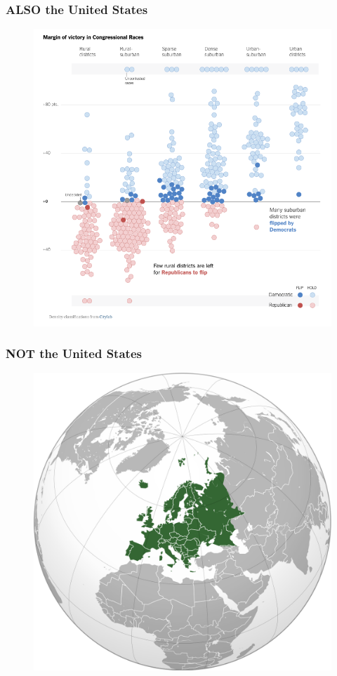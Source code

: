 \documentclass[20pt]{beamer}
\begin{document}
\begin{frame}
\frametitle{ALSO the United States}
\begin{figure}[H]    \centering
	{	 \includegraphics[width=.7\textwidth]{ClayLab}}
\end{figure}
\end{frame}

\begin{frame}
\frametitle{NOT the United States}
\begin{figure}[H]    \centering
	{	 \includegraphics[width=.7\textwidth]{Europe}}
\end{figure}
\end{frame}
\end{document}
